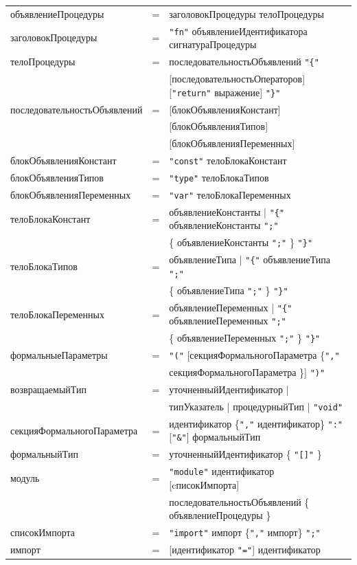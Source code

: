 \documentclass[a4paper,12pt]{article}
\newcommand{\lit}[1]{\texttt{"#1"}}
\begin{document}
\begin{center}
\begin{longtable}{l c l}
            объявлениеПроцедуры & = & заголовокПроцедуры телоПроцедуры \\
            заголовокПроцедуры & = & \lit{fn} объявлениеИдентификатора сигнатураПроцедуры \\
            телоПроцедуры & = & последовательностьОбъявлений \lit{\{} \\
            & & [последовательностьОператоров] [\lit{return} выражение] \lit{\}} \\
            последовательностьОбъявлений & = & [блокОбъявленияКонстант] \\
            & & [блокОбъявленияТипов] \\
            & & [блокОбъявленияПеременных] \\
            блокОбъявленияКонстант & = & \lit{const} телоБлокаКонстант \\
            блокОбъявленияТипов & = & \lit{type} телоБлокаТипов \\
            блокОбъявленияПеременных & = & \lit{var} телоБлокаПеременных \\
            телоБлокаКонстант & = & объявлениеКонстанты | \lit{\{} объявлениеКонстанты \lit{;} \\
            & & \{ объявлениеКонстанты \lit{;} \} \lit{\}} \\
            телоБлокаТипов & = & объявлениеТипа | \lit{\{} объявлениеТипа \lit{;} \\
            & & \{ объявлениеТипа \lit{;} \} \lit{\}} \\
            телоБлокаПеременных & = & объявлениеПеременных | \lit{\{} объявлениеПеременных \lit{;} \\
            & & \{ объявлениеПеременных \lit{;} \} \lit{\}} \\
            формальныеПараметры & = & \lit{(} [секцияФормальногоПараметра \{\lit{,} \\
            & & секцияФормальногоПараметра \}] \lit{)} \\
            возвращаемыйТип & = & уточненныйИдентификатор | \\
            & & типУказатель | процедурныйТип | \lit{void} \\
            секцияФормальногоПараметра & = & идентификатор \{\lit{,} идентификатор\} \lit{:} [\lit{\&}] формальныйТип \\
            формальныйТип & = & уточненныйИдентификатор \{ \lit{[]} \} \\
            модуль & = & \lit{module} идентификатор [cписокИмпорта] \\
            & & последовательностьОбъявлений \{ объявлениеПроцедуры \} \\
            списокИмпорта & = & \lit{import} импорт \{\lit{,} импорт\} \lit{;} \\
            импорт & = & [идентификатор \lit{=}] идентификатор \\
        \end{longtable}
    \end{center}
\end{document}
